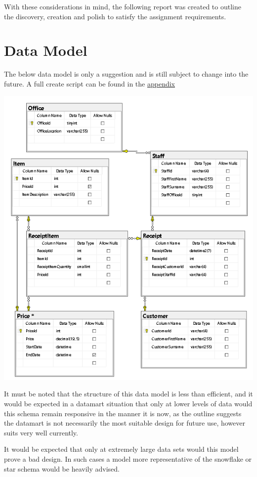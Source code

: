 \documentclass{article}
\begin{document}
    With these considerations in mind, the following report was created to outline
    the discovery, creation and polish to satisfy the assignment requirements.

    \newpage
    \section{Data Model}
    The below data model is only a suggestion and is still subject to change into the future. A full create script can be found in the \hyperref[sec:Appendix]{\color{blue}appendix}
        \begin{center}
            \includegraphics[height=\textheight-140pt,keepaspectratio]{Images/Suggested_Schema.PNG}
        \end{center}
    It must be noted that the structure of this data model is 
    less than efficient, and it would be expected in a datamart
    situation that only at lower levels of data would this schema
    remain responsive in the manner it is now, as the outline
    suggests the datamart is not necessarily the most suitable
    design for future use, however suits very well currently.
    \par
    It would be expected that only at extremely large data sets
    would this model prove a bad design. In such cases a model 
    more representative of the snowflake or star schema would be
    heavily advised.
\end{document}
